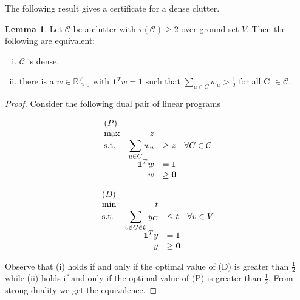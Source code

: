 \documentclass[a4paper, 12pt, twoside=false]{scrbook}
\theoremstyle{definition}
\newtheorem{lemma}[theorem]{Lemma}
\newcommand*{\IR}{\ensuremath{\mathbb{R}}}
\begin{document}
The following result gives a certificate for a dense clutter.
\begin{lemma}
    Let $\mathcal{C}$ be a clutter with $\tau(\mathcal{C})\geq 2$ over ground set $V$.
    Then the following are equivalent:
    \leavevmode
    \begin{enumerate}[(i)]
        \item $\mathcal{C}$ is dense,
        \item there is a $w \in \IR_{\geq 0}^V$ with $\textbf{1}^Tw=1$ such that $\sum_{u \in C} w_u > \frac 12$ for all C $\in \mathcal{C}$.
    \end{enumerate}
\end{lemma}

\begin{proof}
    Consider the following dual pair of linear programs
    \newline
    \newline
    \begin{minipage}{.5\linewidth}
        \begin{equation*}
            \begin{array}{l@{\quad} r l l}
                (P)\\
                \max          &z   \\
                \mathrm{s.t.}  &\displaystyle\sum\limits_{u\in C} w_u &\geq  z \quad \forall C \in \mathcal{C} \\
                    & \textbf{1}^Tw &=   1 \\
                    &   w &\geq   \textbf{0}
            \end{array}
        \end{equation*}
    \end{minipage}
    \begin{minipage}{.5\linewidth}
        \begin{equation*}
            \begin{array}{l@{\quad} r l l}
                (D)\\
                \min          &t   \\
                \mathrm{s.t.}  &\displaystyle\sum\limits_{v \in C \in \mathcal{C}} y_C &\leq  t \quad \forall v \in V \\
                    & \textbf{1}^Ty &=   1 \\
                    &   y &\geq   \textbf{0}
            \end{array}
        \end{equation*}
    \end{minipage}
    \newline
    \newline
    Observe that (i) holds if and only if the optimal value of (D) is greater than $\frac 12$ while (ii) holds if and only if the optimal value of (P) is greater than $\frac 12$.
    From strong duality we get the equivalence.
\end{proof}
\end{document}
